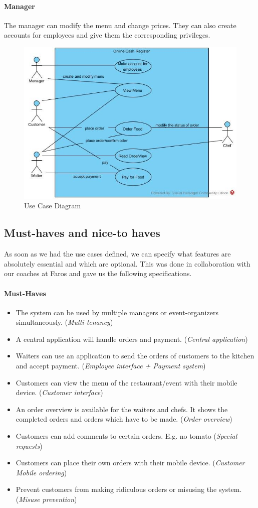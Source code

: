 \documentclass[12pt]{article}
\begin{document}
\paragraph{Manager}
The manager can modify the menu and change prices. They can also create accounts for employees and give them the corresponding privileges.\\

\begin{figure}[h!]
	\centering
	\includegraphics[width=0.75\linewidth]{usecase.jpg}
	\caption{Use Case Diagram}
	\label{fig:usecase}
\end{figure}

\subsection{Must-haves and nice-to haves}
As soon as we had the use cases defined, we can specify what features are absolutely essential and which are optional. This was done in collaboration with our coaches at Faros and gave us the following specifications.
\paragraph{Must-Haves}
\begin{itemize}
	\item The system can be used by multiple managers or event-organizers simultaneously. 
	(\textit{Multi-tenancy})
	\item A central application will handle orders and payment. 
	(\textit{Central application})
	\item Waiters can use an application to send the orders of customers to the kitchen and accept payment. 
	(\textit{Employee interface + Payment system})
	\item Customers can view the menu of the restaurant/event with their mobile device. 
	(\textit{Customer interface})
	\item An order overview is available for the waiters and chefs. It shows the completed orders and orders which have to be made. 
	(\textit{Order overview})
	\item Customers can add comments to certain orders. E.g. no tomato
	(\textit{Special requests}) 
	\item Customers can place their own orders with their mobile device. 
	(\textit{Customer Mobile ordering})
	\item Prevent customers from making ridiculous orders or misusing the system.
	(\textit{Misuse prevention})
\end{itemize}
\end{document}
